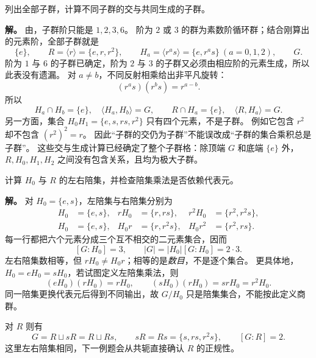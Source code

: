 \begin{workedexample}[全部子群与子群格中的运算]
\label{ex:d3-comprehensive-subgroups}
列出全部子群，计算不同子群的交与共同生成的子群。

\textbf{解。} 由，子群阶只能是 $1,2,3,6$。
阶为 $2$ 或 $3$ 的群为素数阶循环群；结合刚算出的元素阶，全部子群就是
\[
\{e\},\qquad R=\langle r\rangle=\{e,r,r^2\},\qquad
H_a=\langle r^a s\rangle=\{e,r^a s\}\ (a=0,1,2),\qquad G.
\]
阶为 $1$ 与 $6$ 的子群已确定，阶为 $2$ 与 $3$ 的子群又必须由相应阶的元素生成，所以此表没有遗漏。
对 $a\ne b$，不同反射相乘给出非平凡旋转：
\[
(r^a s)(r^b s)=r^{a-b}.
\]
所以
\[
H_a\cap H_b=\{e\},\quad \langle H_a,H_b\rangle=G,
\qquad R\cap H_a=\{e\},\quad \langle R,H_a\rangle=G.
\]
另一方面，集合 $H_0H_1=\{e,s,rs,r^2\}$ 只有四个元素，不是子群。
例如它包含 $r^2$ 却不包含 $(r^2)^2=r$。
因此“子群的交仍为子群”不能误改成“子群的集合乘积总是子群”。
这些交与生成计算已经确定了整个子群格：除顶端 $G$ 和底端 $\{e\}$ 外，
$R,H_0,H_1,H_2$ 之间没有包含关系，且均为极大子群。
\end{workedexample}

\begin{workedexample}
\label{ex:d3-comprehensive-cosets}
计算 $H_0$ 与 $R$ 的左右陪集，并检查陪集乘法是否依赖代表元。

\textbf{解。} 对 $H_0=\{e,s\}$，左陪集与右陪集分别为
\begin{align*}
H_0&=\{e,s\},&rH_0&=\{r,rs\},&r^2H_0&=\{r^2,r^2s\},\\
H_0&=\{e,s\},&H_0r&=\{r,r^2s\},&H_0r^2&=\{r^2,rs\}.
\end{align*}
每一行都把六个元素分成三个互不相交的二元素集合，因而
\[
[G:H_0]=3,\qquad |G|=|H_0|[G:H_0]=2\cdot3.
\]
左右陪集数相等，但 $rH_0\ne H_0r$；相等的是\emph{数目}，不是逐个集合。
更具体地，$H_0=eH_0=sH_0$，若试图定义左陪集乘法，则
\[
(eH_0)(rH_0)=rH_0,\qquad
(sH_0)(rH_0)=srH_0=r^2H_0.
\]
同一陪集更换代表元后得到不同输出，故 $G/H_0$ 只是陪集集合，不能按此定义商群。

对 $R$ 则有
\[
G=R\sqcup sR=R\sqcup Rs,\qquad
sR=Rs=\{s,rs,r^2s\},\qquad [G:R]=2.
\]
这里左右陪集相同，下一例题会从共轭直接确认 $R$ 的正规性。
\end{workedexample}

